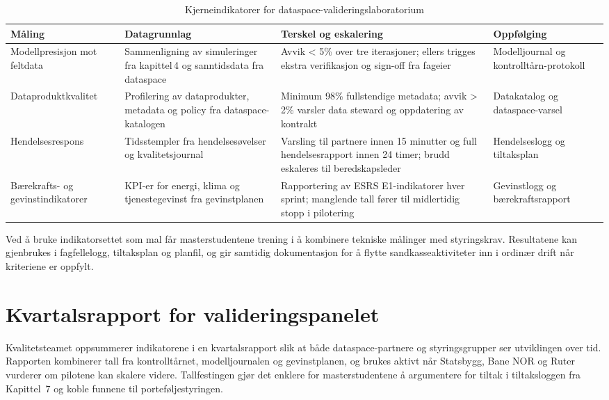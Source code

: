 \begin{table}[ht]
    \centering
    \caption{Kjerneindikatorer for dataspace-valideringslaboratorium}
    \label{tab:dataspaceindikatorer}
    \begin{tabular}{|p{3.2cm}|p{4.8cm}|p{4.2cm}|p{3.2cm}|}
        \hline
        \textbf{Måling} & \textbf{Datagrunnlag} & \textbf{Terskel og eskalering} & \textbf{Oppfølging} \\
        \hline
        Modellpresisjon mot feltdata & Sammenligning av simuleringer fra kapittel\,4 og sanntidsdata fra dataspace & Avvik \textless{} 5\% over tre iterasjoner; ellers trigges ekstra verifikasjon og sign-off fra fageier & Modelljournal og kontrolltårn-protokoll \\
        \hline
        Dataproduktkvalitet & Profilering av dataprodukter, metadata og policy fra dataspace-katalogen & Minimum 98\% fullstendige metadata; avvik \textgreater{} 2\% varsler data steward og oppdatering av kontrakt & Datakatalog og dataspace-varsel \\
        \hline
        Hendelsesrespons & Tidsstempler fra hendelsesøvelser og kvalitetsjournal & Varsling til partnere innen 15 minutter og full hendelsesrapport innen 24 timer; brudd eskaleres til beredskapsleder & Hendelseslogg og tiltaksplan \\
        \hline
        Bærekrafts- og gevinstindikatorer & KPI-er for energi, klima og tjenestegevinst fra gevinstplanen & Rapportering av ESRS E1-indikatorer hver sprint; manglende tall fører til midlertidig stopp i pilotering & Gevinstlogg og bærekraftsrapport \\
        \hline
    \end{tabular}
\end{table}

Ved å bruke indikatorsettet som mal får masterstudentene trening i å kombinere tekniske målinger med styringskrav. Resultatene kan gjenbrukes i fagfellelogg, tiltaksplan og planfil, og gir samtidig dokumentasjon for å flytte sandkasseaktiviteter inn i ordinær drift når kriteriene er oppfylt.

\section{Kvartalsrapport for valideringspanelet}
Kvalitetsteamet oppsummerer indikatorene i en kvartalsrapport slik at både dataspace-partnere og styringsgrupper ser utviklingen over tid. Rapporten kombinerer tall fra kontrolltårnet, modelljournalen og gevinstplanen, og brukes aktivt når Statsbygg, Bane NOR og Ruter vurderer om pilotene kan skalere videre.\citep{statsbygg2023digitalmodenhet,banenor2024leverandor,ruter2024mobilitetslab} Tallfestingen gjør det enklere for masterstudentene å argumentere for tiltak i tiltaksloggen fra Kapittel~7 og koble funnene til porteføljestyringen.

